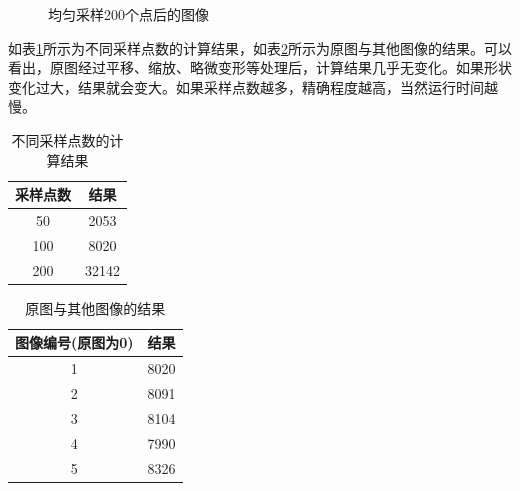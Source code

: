 \documentclass{article}
\begin{document}
\begin{figure}[H]
{	}
	\quad
	\quad
	\caption{均匀采样200个点后的图像}
	\label{fig:4}
\end{figure}

如表\ref{tbl:1}所示为不同采样点数的计算结果，如表\ref{tbl:2}所示为原图与其他图像的结果。可以看出，原图经过平移、缩放、略微变形等处理后，计算结果几乎无变化。如果形状变化过大，结果就会变大。如果采样点数越多，精确程度越高，当然运行时间越慢。

\begin{table}[ht]
	\label{tbl:1}
	\centering
	\caption{不同采样点数的计算结果}
	\begin{tabular}{|c|c|}
		\hline

		采样点数 & 结果 \\ \hline
		50 & 2053 \\ \hline
		100 & 8020 \\ \hline
		200 & 32142 \\ \hline
		
	\end{tabular}
\end{table}

\begin{table}[ht]
	\label{tbl:2}
	\centering
	\caption{原图与其他图像的结果}
	\begin{tabular}{|c|c|}
		\hline
		
		图像编号(原图为0) & 结果 \\ \hline
		1 & 8020 \\ \hline
		2 & 8091 \\ \hline
		3 & 8104 \\ \hline
		4 & 7990 \\ \hline
		5 & 8326 \\ \hline
		
	\end{tabular}
\end{table}
\end{document}
